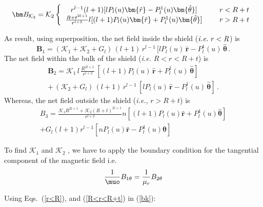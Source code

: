 \begin{equation}\label{r=R+t}
\bm B_{\mathcal{K}_2} =\mathcal{K}_2
\left \{
  \begin{tabular}{ccc}
  $r^{l-1} (l+1)[l P_l(u)\bm{\hat{r}} -  P_l^1(u)\bm{\hat{\theta}} ]$ &  & $r< R+t$  \\
  $\frac{{R+t}^{2l+1}}{r^{l+2}}l[(l+1) P_l(u)\bm{\hat{r}} +  P_l^1(u) \bm{\hat{\theta}} ]$ &  & $r> R+t$  
  \end{tabular}
\right.
\end{equation}

As result, using superposition, the net field inside the shield ($\it{i.e.}\;r<R$) is 
\begin{equation}\label{r<R}
\bm B_1 = (\mathcal{K}_1+\mathcal{K}_2+G_l) \, (l+1)\, r^{l-1} \, [l P_l(u) \, \bm{\hat{r}} -  P_l^1(u)  \, \bm{\hat{\theta}} \, .
\end{equation}
%
The net field  within the bulk of the shield (\textit{i.e.} $R<r<R+t$)  is 
\begin{multline}\label{R<r<R+t}
\bm B_2 = \mathcal{K}_1 \, l\, \frac{R^{2l+1}}{r^{l+2}} \,[(l+1) P_l(u) \, \bm{\hat{r}} +  P_l^1(u)  \, \bm{\hat{\theta}} ] \, \\ +\, (\mathcal{K}_2+G_l) \, (l+1)\, r^{l-1} \, [l P_l(u) \, \bm{\hat{r}} -  P_l^1(u)  \, \bm{\hat{\theta}} ] \, .
\end{multline}
%
Whereas, the net field  outside the shield (\textit{i.e.}, $r>R+t$) is
\begin{multline}\label{r>R}
B_3 =\frac{\mathcal{K}_1R^{2l+1} + \mathcal{K}_2 (R+t)^{2l+1} }{r^{l+2}} n [(l+1) P_l(u) \bm{\hat{r}} +  P_l^1(u)  \bm{\hat{\theta}} ]  \\+ G_l (l+1) r^{l-1} [n P_l(u) \bm{\hat{r}} - P_l^1(u)  \bm{\hat{\theta}} ]
\end{multline}

To find \(\mathcal{K}_1\) and \(\mathcal{K}_2\) , we have to apply the boundary condition for the tangential component of the magnetic field i.e.
\begin{equation}\label{bk}
\frac{1}{\muo} B_{1\theta}=  \frac{1}{\mu_r} B_{2\theta}  
\end{equation}

Using Eqs.~(\ref{r<R}), and (\ref{R<r<R+t}) in (\ref{bk}):


